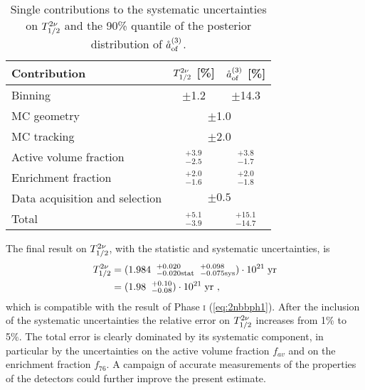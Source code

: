 \begin{table}
	\centering
	\caption{Single contributions to the systematic uncertainties on $T_{1/2}^{2\nu}$ and the 90\% quantile of the posterior distribution of $\mathring{a}_\text{of}^{(3)}$.}\label{tab:sys}
	{\renewcommand{\arraystretch}{1.1}
	\begin{tabular}{lcc}
			\toprule
			Contribution					&	$T_{1/2}^{2\nu}$ [\%]			&	$\mathring{a}_\text{of}^{(3)}$ [\%]			\\
			\midrule
			Binning							&	$\pm$1.2			&	$\pm$14.3			\\
			MC geometry						&	\multicolumn{2}{c}{$\pm$1.0}				\\
			MC tracking						&	\multicolumn{2}{c}{$\pm$2.0}				\\
			Active volume fraction 			&	$^{+3.9}_{-2.5}$	&	$^{+3.8}_{-1.7}$	\\
			Enrichment fraction				&	$^{+2.0}_{-1.6}$	&	$^{+2.0}_{-1.8}$	\\
			Data acquisition and selection	&	\multicolumn{2}{c}{$\pm0.5$}				\\
			\midrule
			Total							&	$^{+5.1}_{-3.9}$	&	$^{+15.1}_{-14.7}$	\\
			\bottomrule
	\end{tabular}}
\end{table}
The final result on $T_{1/2}^{2\nu}$, with the statistic and systematic uncertainties, is
\begin{equation}
	\begin{split}
		\Tnu &=({1.984\;\;^{+0.020}_{-0.020\text{stat}}}\;\;{^{+0.098}_{-0.075\text{sys}}})\cdot10^{21}\;\text{yr}\\
				   &=(1.98\;\;^{+0.10}_{-0.08})\cdot10^{21}\;\text{yr}\ ,\\
	\end{split}\label{eq:2nbb_final}
\end{equation}
which is compatible with the result of {\gerda} Phase \textsc{i} (\ref{eq:2nbbph1}). After the inclusion of the systematic uncertainties the relative error on $T_{1/2}^{2\nu}$ increases from 1\% to 5\%. The total error is clearly dominated by its systematic component, in particular by the uncertainties on the active volume fraction $f_{av}$ and on the enrichment fraction $f_{76}$. A campaign of accurate measurements of the properties of the detectors could further improve the present estimate.

